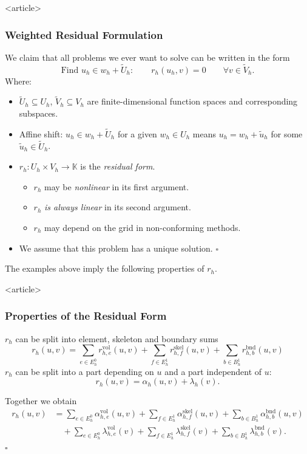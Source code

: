 \begin{frame}<article>
\frametitle<presentation>{Weighted Residual Formulation}
\begin{Def}
We claim that all problems we ever want to solve can be written in the form
\begin{equation}
\text{Find } u_h\in w_h + \tilde{U}_h : \qquad r_h(u_h,v) =
0 \qquad \forall v\in \tilde{V}_h.  
\end{equation}
Where:
\begin{itemize}
\item $\tilde{U}_h\subseteq U_h$, $\tilde{V}_h\subseteq V_h$ are
finite-dimensional function spaces and corresponding subspaces.
\item Affine shift: $u_h\in w_h + \tilde{U}_h$ for a given $w_h\in U_h$ means
$u_h = w_h + \tilde{u}_h$ for some $\tilde{u}_h\in\tilde{U}_h$.
\item $r_h : U_h \times V_h \to \mathbb{K}$ is the \textit{residual form}.
\begin{itemize}
\item $r_h$ may be \textit{nonlinear} in its first argument.
\item $r_h$ \textit{is always linear} in its second argument.
\item $r_h$ may depend on the grid in non-conforming methods.
\end{itemize}
\item We assume that this problem has a unique solution. \hfill$\square$
\end{itemize}
\end{Def}
\end{frame}

The examples above imply the following properties of $r_h$.

\begin{frame}<article>
\frametitle<presentation>{Properties of the Residual Form}
\begin{Pro}[Splitting]
$r_h$ can be split into element, skeleton and boundary sums
\begin{equation*}
r_h(u,v) = \sum_{e\in E^0_h} r^\text{vol}_{h,e}(u,v) + \sum_{f\in E^1_h} r^\text{skel}_{h,f}(u,v)
+ \sum_{b\in B^1_h} r^\text{bnd}_{h,b}(u,v)
\end{equation*}
$r_h$ can be split into a part depending
on $u$ and a part independent of $u$:
\begin{equation*}
r_h(u,v) = \alpha_h(u,v) + \lambda_h(v) .
\end{equation*}

Together we obtain
\begin{equation}
\begin{split}
r_h(u,v) &= \sum_{e\in E^0_h} \alpha^\text{vol}_{h,e}(u,v) + \sum_{f\in E^1_h} \alpha^\text{skel}_{h,f}(u,v)
+ \sum_{b\in B^1_h} \alpha^\text{bnd}_{h,b}(u,v)\\
&\quad + \sum_{e\in E^0_h} \lambda^\text{vol}_{h,e}(v) + \sum_{f\in E^1_h} \lambda^\text{skel}_{h,f}(v)
+ \sum_{b\in B^1_h} \lambda^\text{bnd}_{h,b}(v) .
\end{split}
\end{equation}
\hfill$\square$
\end{Pro}
\end{frame}

